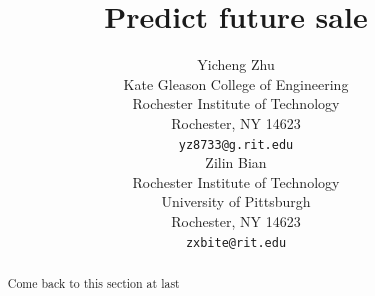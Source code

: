 \documentclass{article}
\title{Predict future sale}
\author{
 Yicheng Zhu \\
  Kate Gleason College of Engineering\\
  Rochester Institute of Technology\\
  Rochester, NY 14623\\
  \texttt{yz8733@g.rit.edu} \\
   \And
 Zilin Bian \\
  Rochester Institute of Technology\\
  University of Pittsburgh\\
  Rochester, NY 14623 \\
  \texttt{zxbite@rit.edu} \\
}
\begin{document}
\maketitle
\begin{abstract}
Come back to this section at last

\end{abstract}








  






\end{document}
